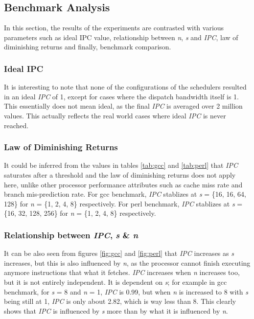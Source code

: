 \subsection{Benchmark Analysis}
In this section, the results of the experiments are contrasted with various parameters such as ideal IPC value, relationship between \textit{n}, \textit{s} and \textit{IPC}, law of diminishing returns and finally, benchmark comparison.

\subsubsection{Ideal IPC}
It is interesting to note that none of the configurations of the schedulers resulted in an ideal \textit{IPC} of 1, except for cases where the dispatch bandwidth itself is 1. This essentially does not mean ideal, as the final \textit{IPC} is averaged over 2 million values. This actually reflects the real world cases where ideal \textit{IPC} is never reached.

\subsubsection{Law of Diminishing Returns}
It could be inferred from the values in tables \ref{tab:gcc} and \ref{tab:perl} that \textit{IPC} saturates after a threshold and the law of diminishing returns does not apply here, unlike other processor performance attributes such as cache miss rate and branch mis-prediction rate. For gcc benchmark, \textit{IPC} stablizes at \textit{s} = \{16, 16, 64, 128\} for \textit{n} = \{1, 2, 4, 8\} respectively. For perl benchmark, \textit{IPC} stablizes at \textit{s} = \{16, 32, 128, 256\} for \textit{n} = \{1, 2, 4, 8\} respectively. 

\subsubsection{Relationship between \textit{IPC}, \textit{s} \& \textit{n}}
It can be also seen from figures \ref{fig:gcc} and \ref{fig:perl} that \textit{IPC} increases as \textit{s} increases, but this is also influenced by \textit{n}, as the processor cannot finish executing anymore instructions that what it fetches. \textit{IPC} increases when \textit{n} increases too, but it is not entirely independent. It is dependent on \textit{s}; for example in gcc benchmark, for \textit{s} = 8 and \textit{n} = 1, \textit{IPC} is 0.99, but when \textit{n} is increased to 8 with \textit{s} being still at 1, \textit{IPC} is only about 2.82, which is way less than 8. This clearly shows that \textit{IPC} is influenced by \textit{s} more than by what it is influenced by \textit{n}.

